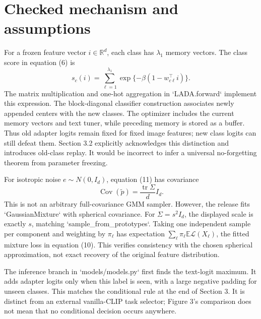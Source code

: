 \documentclass[10pt]{article}
\begin{document}
\section*{Checked mechanism and assumptions}
For a frozen feature vector \(i\in\mathbb R^d\), each class has \(\lambda_1\) memory vectors. The class score in equation (6) is \[s_c(i)=\sum_{\ell=1}^{\lambda_1}\exp\{-\beta(1-w_{c\ell}^{\top}i)\}.\] The matrix multiplication and one-hot aggregation in `LADA.forward` implement this expression. The block-diagonal classifier construction associates newly appended centers with the new classes. The optimizer includes the current memory vectors and text tuner, while preceding memory is stored as a buffer. Thus old adapter logits remain fixed for fixed image features; new class logits can still defeat them. Section 3.2 explicitly acknowledges this distinction and introduces old-class replay. It would be incorrect to infer a universal no-forgetting theorem from parameter freezing.\par
For isotropic noise \(e\sim N(0,I_d)\), equation (11) has covariance \[\operatorname{Cov}(\widetilde p)=\frac{\operatorname{tr}\Sigma}{d}I_d.\] This is not an arbitrary full-covariance GMM sampler. However, the release fits `GaussianMixture` with spherical covariance. For \(\Sigma=s^2I_d\), the displayed scale is exactly \(s\), matching `sample\_from\_prototypes`. Taking one independent sample per component and weighting by \(\pi_\ell\) has expectation \(\sum_\ell\pi_\ell\mathbb E\mathcal L(X_\ell)\), the fitted mixture loss in equation (10). This verifies consistency with the chosen spherical approximation, not exact recovery of the original feature distribution.\par
The inference branch in `models/models.py` first finds the text-logit maximum. It adds adapter logits only when this label is seen, with a large negative padding for unseen classes. This matches the conditional rule at the end of Section 3. It is distinct from an external vanilla-CLIP task selector; Figure 3’s comparison does not mean that no conditional decision occurs anywhere.\par
\end{document}
